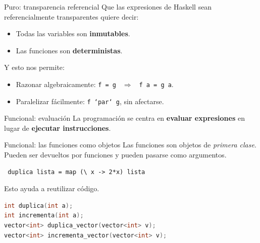 \begin{frame}[fragile]{Puro: transparencia referencial}
  Que las expresiones de Haskell sean referencialmente transparentes
  quiere decir:
  \begin{itemize}
   \item Todas las variables son \textbf{inmutables}.
   \item Las funciones son \textbf{deterministas}.
  \end{itemize}

  \espacio

  Y esto nos permite:
  \begin{itemize}
   \item Razonar algebraicamente: \texttt{f = g } $\Rightarrow$ \texttt{ f a = g a}.
   \item Paralelizar fácilmente: \texttt{f `par` g}, sin afectarse.
  \end{itemize}



\end{frame}

\begin{frame}[fragile]{Funcional: evaluación}
  La programación se centra en \textbf{evaluar expresiones} en
  lugar de \textbf{ejecutar instrucciones}.
\end{frame}

\begin{frame}[fragile]{Funcional: las funciones como objetos}
 Las funciones son objetos de \textit{primera clase}. Pueden ser devueltos
 por funciones y pueden pasarse como argumentos.

 \begin{lstlisting}
 duplica lista = map (\ x -> 2*x) lista
 \end{lstlisting}

 \espacio
 Esto ayuda a reutilizar código.
 \begin{lstlisting}[language=C++]
int duplica(int a);
int incrementa(int a);
vector<int> duplica_vector(vector<int> v);
vector<int> incrementa_vector(vector<int> v);
 \end{lstlisting}

\end{frame}

